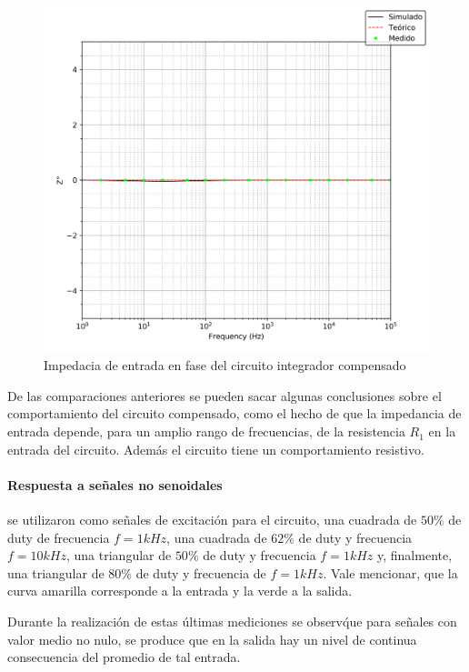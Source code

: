 \begin{figure}[H]
	\centering
	\includegraphics[scale=0.6]{../EJ4/Recursos/Integrador_compensado/impedancia_fase.png}
	\caption{Impedacia de entrada en fase del circuito integrador compensado}
	\label{fig:integrador_compensado_impedancia_fase}
\end{figure}

De las comparaciones anteriores se pueden sacar algunas conclusiones sobre el comportamiento del circuito compensado, como el hecho de que la impedancia
de entrada depende, para un amplio rango de frecuencias, de la resistencia $R_1$ en la entrada del circuito. Adem\'as el circuito tiene un comportamiento
resistivo.

\paragraph*{Respuesta a se\~nales no senoidales} se utilizaron como se\~nales de excitaci\'on para el circuito, una cuadrada de $50 \%$ de duty de frecuencia $f = 1kHz$, una
cuadrada de $62 \%$ de duty y frecuencia $f = 10kHz$, una triangular de $50 \%$ de duty y frecuencia $f = 1kHz$ y, finalmente, una triangular de $80 \%$ de duty y frecuencia de 
$f = 1kHz$. Vale mencionar, que la curva amarilla corresponde a la entrada y la verde a la salida.

Durante la realizaci\'on de estas \'ultimas mediciones se observ\' que para se\~nales con valor medio no nulo, se produce que en la salida
hay un nivel de continua consecuencia del promedio de tal entrada.

